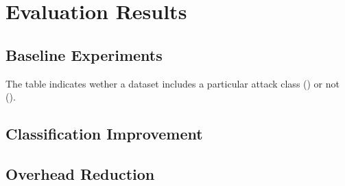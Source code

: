 \documentclass[../../main.tex]{subfiles}
\begin{document}
\section{Evaluation Results}

\subsection{Baseline Experiments}


\begin{table}[H]
    \footnotesize
    \centering
    \setlength{\extrarowheight}{0pt}
    \addtolength{\extrarowheight}{\aboverulesep}
    \addtolength{\extrarowheight}{\belowrulesep}
    \addtolength{\tabcolsep}{-0.4em}
    \setlength{\aboverulesep}{0pt}
    \setlength{\belowrulesep}{0pt}
    \setlength{\extrarowheight}{.1em}
     
    \caption[Baseline Detection Performance]{The table indicates wether a dataset includes a particular attack class (\cmark) or not (\xmark).}
    \label{tab:baseline_detection}
\end{table}

\subsection{Classification Improvement}

\subsection{Overhead Reduction}

\end{document}
